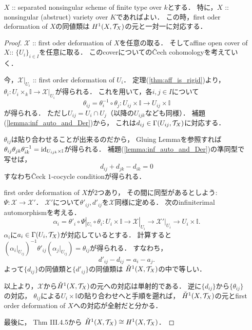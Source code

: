 \documentclass[a4paper]{jsarticle}
\newcommand{\dualnum}{\mathbb{I}}
\newcommand{\defX}{\mathcal{X}}
\begin{document}
    \begin{Thm}
        $X$ :: separated nonsingular scheme of finite type over $k$とする．
        特に，$X$ :: nonsingular (abstruct) variety over $K$であればよい．
        この時，first oder deformation of $X$の同値類は
        $H^1(X, \mathcal{T}_X)$の元と一対一に対応する．
    \end{Thm}
    \begin{proof}
        $\defX$ :: first oder deformation of $X$を任意の取る．
        そしてaffine open cover of $X$:: $\{U_i\}_{i \in I}$を任意に取る．
        このcoverについての\v{C}ech cohomologyを考えていく．

        今，$\defX|_{U_i}$ :: first order deformation of $U_i$．
        定理(\ref{thm:aff_is_rigid})より，
        $\theta_{i}: U_i \times_{k} \dualnum \to \defX|_{U_i}$が得られる．
        これを用いて，各$i,j \in I$について
        \[ \theta_{ij}=\theta_{i}^{-1} \circ \theta_{j}:U_{ij} \times \dualnum \to U_{ij} \times \dualnum \]
        が得られる．
        ただし$U_{ij}=U_i \cap U_j$（以降の$U_{ijk}$なども同様）．
        補題(\ref{lemma:inf_auto_and_Der})から，
        これは$d_{ij} \in \Gamma(U_{ij}, \mathcal{T}_{X})$に対応する．
        
        $\theta_{ij}$は貼り合わせることが出来るのだから，
        Gluing Lemmaを参照すれば
        $\theta_{ij} \theta_{jk} \theta_{ik}^{-1}=\id[U_{ijk} \times \dualnum]$が得られる．
        補題(\ref{lemma:inf_auto_and_Der})の準同型で写せば，
        \[ d_{ij}+d_{jk}-d_{ik}=0 \]
        すなわち\v{C}eck $1$-cocycle conditionが得られる．

        first order deformation of $X$が$2$つあり，
        その間に同型があるとしよう: $\Psi: \defX \to \defX'$．
        $\defX'$について$\theta'_{ij}, d'_{ij}$を$\defX$同様に定める．
        次のinfiniterimal automorphismを考える．
        \[
            \alpha_{i}=\theta'_{i} \circ \Psi|_{U_i} \circ \theta_{i}:
            U_i \times \dualnum \to \defX|_{U_i} \to \defX'|_{U_i} \to U_i \times \dualnum.
        \]
        $\alpha_i$に$a_i \in \Gamma(U_i, \mathcal{T}_X)$が対応しているとする．
        計算すると
        $(\alpha_{i}|_{U_{ij}})^{-1} \theta'_{ij} (\alpha_{j}|_{U_{ij}})=\theta_{ij}$が得られる．
        すなわち，
        \[ d'_{ij}-d_{ij}=a_{i}-a_{j}. \]
        よって$\{d_{ij}\}$の同値類と$\{d'_{ij}\}$の同値類は
        $\check{H}^1(X, \mathcal{T}_X)$の中で等しい．

        以上より，$\defX$から$\check{H}^1(X, \mathcal{T}_X)$の元への対応は単射的である．
        逆に$\{d_{ij}\}$から$\{\theta_{ij}\}$の対応，
        $\theta_{ij}$による$U_{i} \times \dualnum$の貼り合わせへと手順を遡れば，
        $\check{H}^1(X, \mathcal{T}_X)$の元とfirst order deformation of $X$への対応が全射だと分かる．

        最後に，\cite{HarAG} Thm III.4.5から
        $\check{H}^1(X, \mathcal{T}_X) \cong H^1(X, \mathcal{T}_X)$．
    \end{proof}
\end{document}
